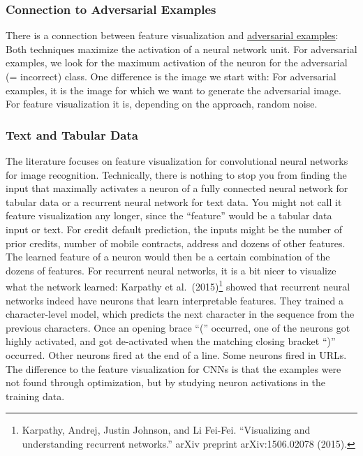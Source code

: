 \documentclass[
  11pt,
]{scrbook}
\begin{document}
\hypertarget{connection-to-adversarial-examples}{%
\subsubsection{Connection to Adversarial Examples}\label{connection-to-adversarial-examples}}

There is a connection between feature visualization and \protect\hyperlink{adversarial}{adversarial examples}:
Both techniques maximize the activation of a neural network unit.
For adversarial examples, we look for the maximum activation of the neuron for the adversarial (= incorrect) class.
One difference is the image we start with:
For adversarial examples, it is the image for which we want to generate the adversarial image.
For feature visualization it is, depending on the approach, random noise.

\hypertarget{text-and-tabular-data}{%
\subsubsection{Text and Tabular Data}\label{text-and-tabular-data}}

The literature focuses on feature visualization for convolutional neural networks for image recognition.
Technically, there is nothing to stop you from finding the input that maximally activates a neuron of a fully connected neural network for tabular data or a recurrent neural network for text data.
You might not call it feature visualization any longer, since the ``feature'' would be a tabular data input or text.
For credit default prediction, the inputs might be the number of prior credits, number of mobile contracts, address and dozens of other features.
The learned feature of a neuron would then be a certain combination of the dozens of features.
For recurrent neural networks, it is a bit nicer to visualize what the network learned:
Karpathy et al.~(2015)\footnote{Karpathy, Andrej, Justin Johnson, and Li Fei-Fei. ``Visualizing and understanding recurrent networks.'' arXiv preprint arXiv:1506.02078 (2015).} showed that recurrent neural networks indeed have neurons that learn interpretable features.
They trained a character-level model, which predicts the next character in the sequence from the previous characters.
Once an opening brace ``('' occurred, one of the neurons got highly activated, and got de-activated when the matching closing bracket ``)'' occurred.
Other neurons fired at the end of a line.
Some neurons fired in URLs.
The difference to the feature visualization for CNNs is that the examples were not found through optimization, but by studying neuron activations in the training data.
\end{document}

